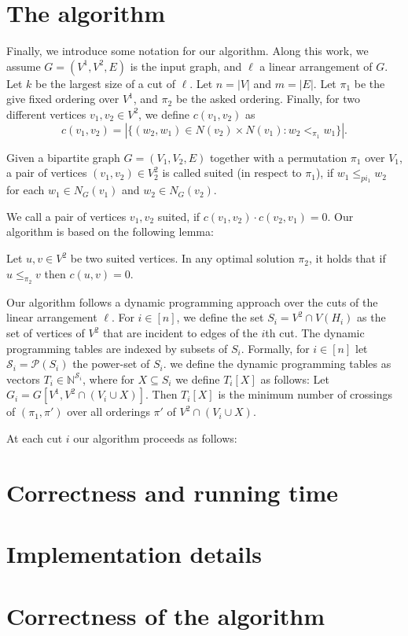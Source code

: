 \documentclass[a4paper,UKenglish,cleveref, autoref, thm-restate]{lipics-v2021}
\begin{document}
\section{The algorithm}
Finally, we introduce some notation for our algorithm. Along this work, we assume $G=(V^1,V^2, E)$ is the input graph, and $\ell$ a linear arrangement of $G$. Let $k$ be the largest size of a cut of $\ell$. Let $n = |V|$ and $m=|E|$.
Let $\pi_1$ be the give fixed ordering over $V^1$, and $\pi_2$ be the asked ordering.
Finally, for two different vertices $v_1, v_2 \in V^2$, we define $c(v_1,v_2)$ as
\[c(v_1,v_2) = |\{(w_2, w_1)\in N(v_2)\times N(v_1)\colon w_2 <_{\pi_1} w_1\}|.\] 
\begin{definition}
    Given a bipartite graph $G= (V_1, V_2, E)$ together with a permutation $\pi_1$ over $V_1$, a pair of vertices $(v_1,v_2)\in V_2^2$ is called suited (in respect to $\pi_1$), if $w_1\leq_{pi_1}w_2$ for each $w_1\in N_G(v_1)$ and $w_2\in N_G(v_2)$.
\end{definition}
We call a pair of vertices $v_1, v_2$ suited, if $c(v_1,v_2)\cdot c(v_2,v_1) = 0$.
Our algorithm is based on the following lemma:
\begin{lemma}
    Let $u,v \in V^2$ be two suited vertices. In any optimal solution $\pi_2$, it holds that if $u\leq_{\pi_2} v$ then $c(u,v) = 0$.
\end{lemma}
Our algorithm follows a dynamic programming approach over the cuts of the linear arrangement $\ell$.
For $i\in[n]$, we define the set $S_i = V^2 \cap V(H_i)$ as the set of vertices of $V^2$ that are incident to edges of the $i$th cut.
The dynamic programming tables are indexed by subsets of $S_i$.
Formally, for $i\in [n]$ let $\mathcal{S}_i = \mathcal{P}(S_i)$ the power-set of $S_i$. we define the dynamic programming tables as vectors $T_i \in \mathbb{N}^{\mathcal{S}_i}$, where for $X\subseteq S_i$ we define $T_i[X]$ as follows: Let $G_i = G[V^1, V^2\cap(V_i \cup X)]$. Then $T_i[X]$ is the minimum number of crossings of $(\pi_1, \pi')$ over all orderings $\pi'$ of $V^2\cap(V_i\cup X)$.

At each cut $i$ our algorithm proceeds as follows: 

\section{Correctness and running time}
\section{Implementation details}

\section{Correctness of the algorithm}

\end{document}
